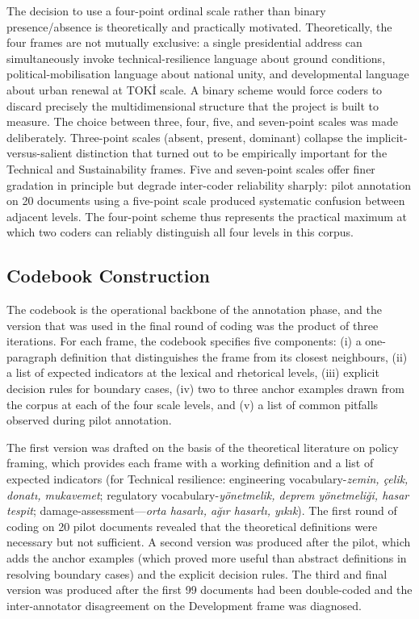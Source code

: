\documentclass[12pt, journal]{IEEEtran}
\begin{document}
The decision to use a four-point ordinal scale rather than binary presence/absence is theoretically and practically motivated. Theoretically, the four frames are not mutually exclusive: a single presidential address can simultaneously invoke technical-resilience language about ground conditions, political-mobilisation language about national unity, and developmental language about urban renewal at TOK\.{I} scale. A binary scheme would force coders to discard precisely the multidimensional structure that the project is built to measure. The choice between three, four, five, and seven-point scales was made deliberately. Three-point scales (absent, present, dominant) collapse the implicit-versus-salient distinction that turned out to be empirically important for the Technical and Sustainability frames. Five and seven-point scales offer finer gradation in principle but degrade inter-coder reliability sharply: pilot annotation on 20 documents using a five-point scale produced systematic confusion between adjacent levels. The four-point scheme thus represents the practical maximum at which two coders can reliably distinguish all four levels in this corpus.

\subsection{Codebook Construction}
The codebook is the operational backbone of the annotation phase, and the version that was used in the final round of coding was the product of three iterations. For each frame, the codebook specifies five components: (i) a one-paragraph definition that distinguishes the frame from its closest neighbours, (ii) a list of expected indicators at the lexical and rhetorical levels, (iii) explicit decision rules for boundary cases, (iv) two to three anchor examples drawn from the corpus at each of the four scale levels, and (v) a list of common pitfalls observed during pilot annotation.

The first version was drafted on the basis of the theoretical literature on policy framing, which provides each frame with a working definition and a list of expected indicators (for Technical resilience: engineering vocabulary-\textit{zemin, \c{c}elik, donat\i, mukavemet}; regulatory vocabulary-\textit{y\"onetmelik, deprem y\"onetmeli\u{g}i, hasar tespit}; damage-assessment---\textit{orta hasarl\i, a\u{g}\i r hasarl\i, y\i k\i k}). The first round of coding on 20 pilot documents revealed that the theoretical definitions were necessary but not sufficient. A second version was produced after the pilot, which adds the anchor examples (which proved more useful than abstract definitions in resolving boundary cases) and the explicit decision rules. The third and final version was produced after the first 99 documents had been double-coded and the inter-annotator disagreement on the Development frame was diagnosed.
\end{document}
